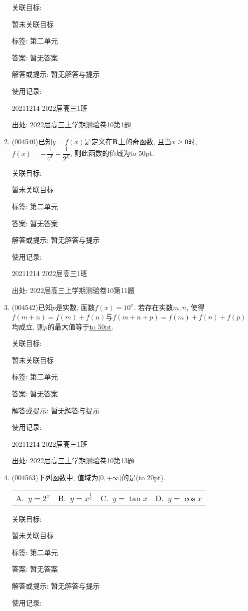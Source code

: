 \documentclass[10pt,a4paper]{article}
\newcommand{\blank}[1]{\underline{\hbox to #1pt{}}}
\newcommand{\bracket}[1]{(\hbox to #1pt{})}
\newcommand{\fourch}[4]{\par\begin{tabular}{p{.23\textwidth}p{.23\textwidth}p{.23\textwidth}p{.23\textwidth}}
A.~#1 &B.~#2& C.~#3& D.~#4
\end{tabular}}
\begin{document}
\begin{enumerate}[1.]
关联目标:

暂未关联目标



标签: 第二单元

答案: 暂无答案

解答或提示: 暂无解答与提示

使用记录:

20211214	2022届高三1班	


出处: 2022届高三上学期测验卷10第1题
\item { (004540)}已知$y=f(x)$是定义在$\mathbf{R}$上的奇函数, 且当$x\ge 0$时, $f(x)=-\dfrac 1{4^x}+\dfrac 1{2^x}$, 则此函数的值域为\blank{50}.


关联目标:

暂未关联目标



标签: 第二单元

答案: 暂无答案

解答或提示: 暂无解答与提示

使用记录:

20211214	2022届高三1班	


出处: 2022届高三上学期测验卷10第11题
\item { (004542)}已知$p$是实数, 函数$f(x)=10^x$. 若存在实数$m,n$, 使得$f(m+n)=f(m)+f(n)$与$f(m+n+p)=f(m)+f(n)+f(p)$均成立, 则$p$的最大值等于\blank{50}.


关联目标:

暂未关联目标



标签: 第二单元

答案: 暂无答案

解答或提示: 暂无解答与提示

使用记录:

20211214	2022届高三1班	


出处: 2022届高三上学期测验卷10第13题
\item { (004563)}下列函数中, 值域为$[0,+\infty)$的是\bracket{20}.
\fourch{$y=2^x$}{$y=x^\frac 12$}{$y=\tan x$}{$y=\cos x$}


关联目标:

暂未关联目标



标签: 第二单元

答案: 暂无答案

解答或提示: 暂无解答与提示

使用记录:


\end{enumerate}
\end{document}

